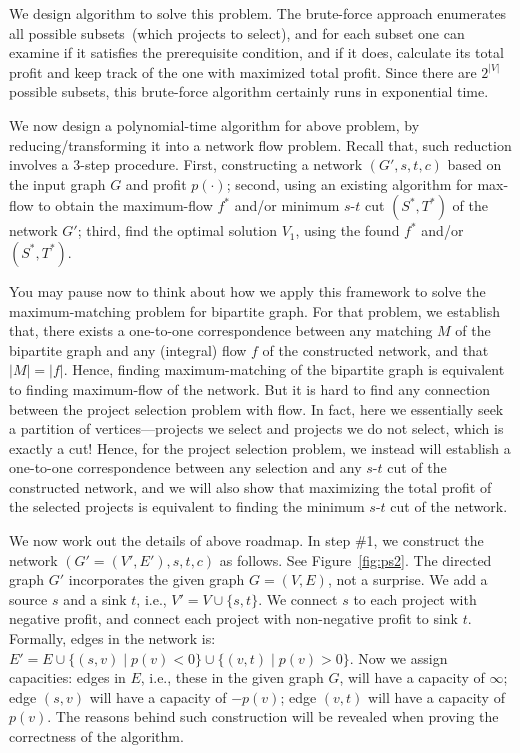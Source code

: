 We design algorithm to solve this problem. The brute-force approach
enumerates all possible subsets~(which projects to select), and for each subset
one can examine if it satisfies the prerequisite condition, and if it does, calculate
its total profit and keep track of the one with maximized total profit. 
Since there are $2^{|V|}$ possible subsets, this brute-force algorithm certainly runs in exponential time.

We now design a polynomial-time algorithm for above problem, by
reducing/transforming it into a network flow problem.
Recall that, such reduction involves a 3-step procedure. First,
constructing a network $(G', s, t, c)$ based on the input graph $G$ and profit
$p(\cdot)$; second, using an existing algorithm for max-flow to obtain the
maximum-flow $f^*$ and/or minimum $s$-$t$ cut $(S^*, T^*)$ of the network $G'$;
third, find the optimal solution $V_1$, using the found $f^*$ and/or $(S^*, T^*)$.

You may pause now to think about how we apply this framework to solve the maximum-matching problem for bipartite graph.
For that problem, we establish that, there exists a one-to-one correspondence between any matching $M$ of the bipartite
graph and any (integral) flow $f$ of the constructed network, and that $|M| = |f|$. Hence, finding maximum-matching of the
bipartite graph is equivalent to finding maximum-flow of the network. 
But it is hard to find any connection between the project selection problem with flow. In fact, here we essentially seek
a partition of vertices---projects we select and projects we do not select, which is exactly a cut!
Hence, for the project selection problem, we instead will establish a
one-to-one correspondence between any selection and any $s$-$t$ cut
of the constructed network, and we will also show that maximizing the
total profit of the selected projects
is equivalent to finding the minimum $s$-$t$ cut of the network.

We now work out the details of above roadmap. In step \#1, we construct the network $(G' = (V',E'),s,t,c)$ as follows.
See Figure~\ref{fig:ps2}. The directed graph $G'$ incorporates the given graph $G = (V, E)$, not a surprise.
We add a source $s$ and a sink $t$, i.e., $V' = V\cup \{s,t\}$. We connect $s$ to each project with negative profit, and
connect each project with non-negative profit to sink $t$. Formally, edges in the network is: 
$E' = E\cup \{(s,v)\mid p(v) < 0\} \cup \{(v,t)\mid p(v) > 0\}$.
Now we assign capacities: edges in $E$, i.e., these in the given graph $G$, will have a capacity of $\infty$;
edge $(s,v)$ will have a capacity of $-p(v)$;
edge $(v,t)$ will have a capacity of $p(v)$.
The reasons behind such construction will be revealed when proving the correctness of the algorithm.

